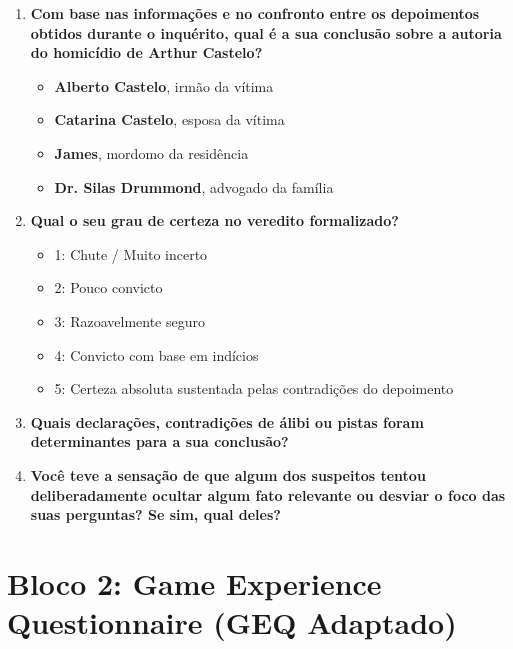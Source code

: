 \begin{enumerate}[label=\textbf{D\arabic*.}, noitemsep, topsep=1pt, parsep=0pt]
    \item \textbf{Com base nas informações e no confronto entre os depoimentos obtidos durante o inquérito, qual é a sua conclusão sobre a autoria do homicídio de Arthur Castelo?}
    \begin{itemize}[label={$\square$}, noitemsep, topsep=1pt, parsep=0pt]
        \item \textbf{Alberto Castelo}, irmão da vítima
        \item \textbf{Catarina Castelo}, esposa da vítima
        \item \textbf{James}, mordomo da residência
        \item \textbf{Dr. Silas Drummond}, advogado da família
    \end{itemize}
    \item \textbf{Qual o seu grau de certeza no veredito formalizado?}
    \begin{itemize}[label={$\square$}, noitemsep, topsep=1pt, parsep=0pt]
        \item 1: Chute / Muito incerto
        \item 2: Pouco convicto
        \item 3: Razoavelmente seguro
        \item 4: Convicto com base em indícios
        \item 5: Certeza absoluta sustentada pelas contradições do depoimento
    \end{itemize}
    \item \textbf{Quais declarações, contradições de álibi ou pistas foram determinantes para a sua conclusão?}
    \item \textbf{Você teve a sensação de que algum dos suspeitos tentou deliberadamente ocultar algum fato relevante ou desviar o foco das suas perguntas? Se sim, qual deles?}
\end{enumerate}

\vspace{0.05cm}

\section{Bloco 2: Game Experience Questionnaire (GEQ Adaptado)}
\label{sec:apendice_d_bloco2}

